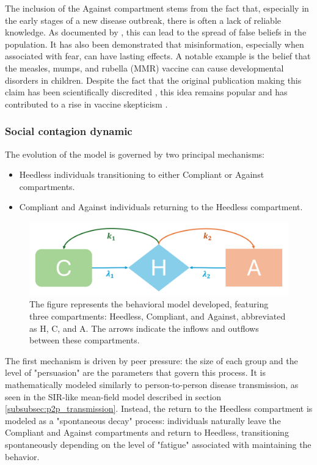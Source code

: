 The inclusion of the Against compartment stems from the fact that, especially in the early stages of a new disease outbreak, there is often a lack of reliable knowledge. As documented by \cite{McCormack_2020}, this can lead to the spread of false beliefs in the population. It has also been demonstrated \cite{owid-vaccine-skepticism} that misinformation, especially when associated with fear, can have lasting effects. A notable example is the belief that the measles, mumps, and rubella (MMR) vaccine can cause developmental disorders in children. Despite the fact that the original publication making this claim has been scientifically discredited \cite{wakefield1998retracted}, this idea remains popular and has contributed to a rise in vaccine skepticism \cite{owid-vaccine-skepticism}.

\subsubsection{Social contagion dynamic}
The evolution of the model is governed by two principal mechanisms: \begin{itemize} 
	\item Heedless individuals transitioning to either Compliant or Against compartments. 
	\item Compliant and Against individuals returning to the Heedless compartment. 
\end{itemize}
\begin{figure}[h]
	\centering
	\includegraphics[width=0.72\linewidth]{1_corpo/figure/behavior_model_figure}
	\caption[Behavior model]{The figure represents the behavioral model developed, featuring three compartments: Heedless, Compliant, and Against, abbreviated as H, C, and A. The arrows indicate the inflows and outflows between these compartments.}
	\label{fig:behaviormodelfigure}
\end{figure}
The first mechanism is driven by peer pressure: the size of each group and the level of "persuasion" are the parameters that govern this process. It is mathematically modeled similarly to person-to-person disease transmission, as seen in the SIR-like mean-field model described in section \ref{subsubsec:p2p_transmission}. Instead, the return to the Heedless compartment is modeled as a "spontaneous decay" process: individuals naturally leave the Compliant and Against compartments and return to Heedless, transitioning spontaneously depending on the level of "fatigue" associated with maintaining the behavior.

